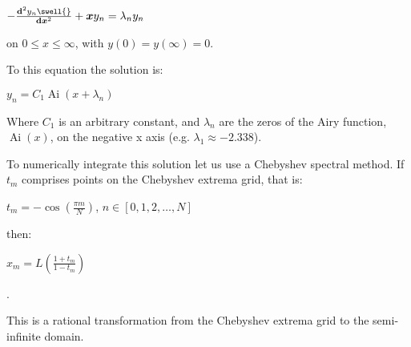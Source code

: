 \documentclass{article}
\newcommand{\tmmathbf}[1]{\ensuremath{\boldsymbol{#1}}}
\newcommand{\tmop}[1]{\ensuremath{\operatorname{#1}}}
\newcommand{\tmtextmd}[1]{{\mdseries{#1}}}
\begin{document}
$- \frac{\mathrm{\ensuremath{\mathbf{d}}}^2 y_n \swell{}}{\mathit{\mathbf{d}}
\text{\tmtextmd{\ensuremath{\tmmathbf{x}}}}^2} +\tmmathbf{x}y_n = \lambda_n
y_n$

on $0 \leqslant x \leqslant \infty$, with $y (0) = y (\infty) = 0$.

To this equation the solution is:

$y_n = C_1 \tmop{Ai} (x + \lambda_n)$

Where $C_1$ is an arbitrary constant, and $\lambda_n$ are the zeros of the
Airy function, $\tmop{Ai} (x)$, on the negative x axis (e.g. $\lambda_1
\approx - 2.338$).

To numerically integrate this solution let us use a Chebyshev spectral
method. If $t_m$ comprises points on the Chebyshev extrema grid, that is:

$t_m = - \cos \left( \frac{\pi m}{N} \right)$, \qquad$n \in [0, 1, 2, \ldots,
N]$

then:

$x_m = L \left( \frac{1 + t_m}{1 - t_m} \right)$

.

This is a rational transformation from the Chebyshev extrema grid to the
semi-infinite domain.
\end{document}

